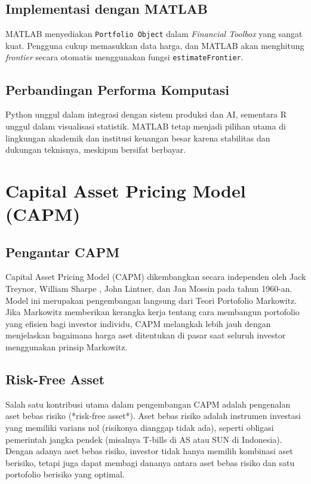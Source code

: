 \documentclass[12pt,a4paper]{book}
\begin{document}
\section{Implementasi dengan MATLAB}
MATLAB menyediakan \texttt{Portfolio Object} dalam \textit{Financial Toolbox} yang sangat kuat. Pengguna cukup memasukkan data harga, dan MATLAB akan menghitung \textit{frontier} secara otomatis menggunakan fungsi \texttt{estimateFrontier}.

\section{Perbandingan Performa Komputasi}
Python unggul dalam integrasi dengan sistem produksi dan AI, sementara R unggul dalam visualisasi statistik. MATLAB tetap menjadi pilihan utama di lingkungan akademik dan institusi keuangan besar karena stabilitas dan dukungan teknisnya, meskipun bersifat berbayar.

\chapter{Capital Asset Pricing Model (CAPM)}

\section{Pengantar CAPM}
Capital Asset Pricing Model (CAPM) dikembangkan secara independen oleh Jack Treynor, William Sharpe \cite{sharpe1964capital}, John Lintner, dan Jan Mossin pada tahun 1960-an. Model ini merupakan pengembangan langsung dari Teori Portofolio Markowitz. Jika Markowitz memberikan kerangka kerja tentang cara membangun portofolio yang efisien bagi investor individu, CAPM melangkah lebih jauh dengan menjelaskan bagaimana harga aset ditentukan di pasar saat seluruh investor menggunakan prinsip Markowitz.

\section{Risk-Free Asset}
Salah satu kontribusi utama dalam pengembangan CAPM adalah pengenalan aset bebas risiko (*risk-free asset*). Aset bebas risiko adalah instrumen investasi yang memiliki varians nol (risikonya dianggap tidak ada), seperti obligasi pemerintah jangka pendek (misalnya T-bills di AS atau SUN di Indonesia). 
Dengan adanya aset bebas risiko, investor tidak hanya memilih kombinasi aset berisiko, tetapi juga dapat membagi dananya antara aset bebas risiko dan satu portofolio berisiko yang optimal.
\end{document}
